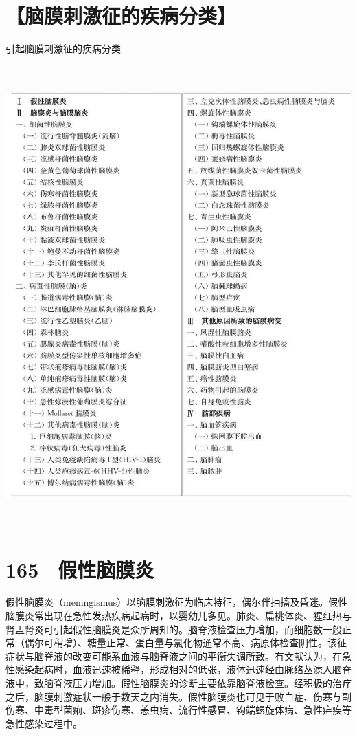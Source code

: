 \section{【脑膜刺激征的疾病分类】}

\begin{table}[htbp]
\centering
\caption{引起脑膜刺激征的疾病分类}
\label{tab50-1}
\includegraphics[width=5.9375in,height=6.97917in]{./images/Image00311.jpg}
\end{table}

\protect\hypertarget{text00383.html}{}{}

\section{165　假性脑膜炎}

假性脑膜炎（meningismus）以脑膜刺激征为临床特征，偶尔伴抽搐及昏迷。假性脑膜炎常出现在急性发热疾病起病时，以婴幼儿多见。肺炎、扁桃体炎、猩红热与肾盂肾炎可引起假性脑膜炎是众所周知的。脑脊液检查压力增加，而细胞数一般正常（偶尔可稍增）、糖量正常、蛋白量与氯化物通常不高、病原体检查阴性。该征症状与脑脊液的改变可能系血液与脑脊液之间的平衡失调所致。有文献认为，在急性感染起病时，血液迅速被稀释，形成相对的低张，液体迅速经由脉络丛滤入脑脊液中，致脑脊液压力增加。假性脑膜炎的诊断主要依靠脑脊液检查。经积极的治疗之后，脑膜刺激症状一般于数天之内消失。假性脑膜炎也可见于败血症、伤寒与副伤寒、中毒型菌痢、斑疹伤寒、恙虫病、流行性感冒、钩端螺旋体病、急性疟疾等急性感染过程中。

